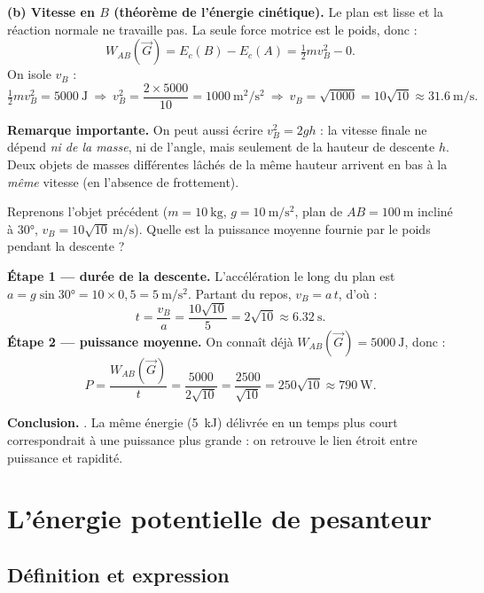 \documentclass[11pt,a4paper]{article}
\newcommand{\vv}[1]{\vec{#1}}
\begin{document}
\begin{exemple}
\textbf{(b) Vitesse en $B$ (théorème de l'énergie cinétique).} Le plan est lisse et la réaction
normale ne travaille pas. La seule force motrice est le poids, donc :
\[
W_{AB}(\vv G)=E_c(B)-E_c(A)=\tfrac12 m v_B^2-0.
\]
On isole $v_B$ :
\[
\tfrac12 m v_B^2=\SI{5000}{\joule}\ \Rightarrow\ v_B^2=\frac{2\times5000}{10}=\SI{1000}{\metre\squared\per\second\squared}
\ \Rightarrow\ v_B=\sqrt{1000}=10\sqrt{10}\approx\SI{31,6}{\metre\per\second}.
\]

\textbf{Remarque importante.} On peut aussi écrire $v_B^2=2gh$ : la vitesse finale ne dépend
\emph{ni de la masse}, ni de l'angle, mais seulement de la hauteur de descente $h$. Deux objets de
masses différentes lâchés de la même hauteur arrivent en bas à la \emph{même} vitesse (en l'absence
de frottement).
\end{exemple}

\begin{exemple}
Reprenons l'objet précédent ($m=\SI{10}{\kilogram}$, $g=\SI{10}{\metre\per\second\squared}$, plan de
$AB=\SI{100}{\metre}$ incliné à $\ang{30}$, $v_B=10\sqrt{10}\ \si{\metre\per\second}$). Quelle est la
puissance moyenne fournie par le poids pendant la descente ?

\smallskip
\textbf{Étape 1 — durée de la descente.} L'accélération le long du plan est
$a=g\sin\ang{30}=10\times0{,}5=\SI{5}{\metre\per\second\squared}$. Partant du repos, $v_B=a\,t$, d'où :
\[
t=\frac{v_B}{a}=\frac{10\sqrt{10}}{5}=2\sqrt{10}\approx\SI{6,32}{\second}.
\]
\textbf{Étape 2 — puissance moyenne.} On connaît déjà $W_{AB}(\vv G)=\SI{5000}{\joule}$, donc :
\[
P=\frac{W_{AB}(\vv G)}{t}=\frac{5000}{2\sqrt{10}}=\frac{2500}{\sqrt{10}}=250\sqrt{10}\approx\SI{790}{\watt}.
\]

\textbf{Conclusion.} . La même énergie
(\SI{5}{\kilo\joule}) délivrée en un temps plus court correspondrait à une puissance plus grande :
on retrouve le lien étroit entre puissance et rapidité.
\end{exemple}

\section{L'énergie potentielle de pesanteur}
\subsection{Définition et expression}
\end{document}
